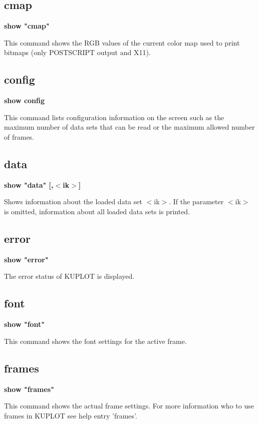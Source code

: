 \subsection*{cmap}
{\bf show "cmap" \par }
\par
\vspace{3pt}
This command shows the RGB values of the current color map used 
to print bitmaps (only POSTSCRIPT output and X11). 
\subsection*{config}
{\bf show config \par }
\par
\vspace{3pt}
This command lists configuration information on the screen such 
as the maximum number of data sets that can be read or the maximum 
allowed number of frames. 
\subsection*{data}
{\bf show "data" [,$ <$ik$> $] \par }
\par
\vspace{3pt}
Shows information about the loaded data set $ <$ik$> $. If the 
parameter $ <$ik$> $ is omitted, information about all loaded 
data sets is printed. 
\subsection*{error}
{\bf show "error" \par }
\par
\vspace{3pt}
The error status of KUPLOT is displayed. 
\subsection*{font}
{\bf show "font" \par }
\par
\vspace{3pt}
This command shows the font settings for the active frame. 
\subsection*{frames}
{\bf show "frames" \par }
\par
\vspace{3pt}
This command shows the actual frame settings. For more information 
who to use frames in KUPLOT see help entry 'frames'. 
